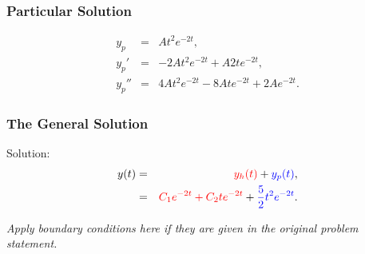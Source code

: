 \begin{frame}
  \frametitle{Particular Solution}

  \vspace*{-3em}
  \begin{eqnarray*}
    y_p & = & A t^2 e^{-2t}, \\
    y_p' & = & -2 A t^2 e^{-2t} + A 2t e^{-2t}, \\
    y_p'' & = & 4 A t^2 e^{-2t} - 8A t e^{-2t} + 2 A e^{-2t}.
  \end{eqnarray*}
  \vspace*{-2.5em}




\end{frame}


\begin{frame}
  \frametitle{The General Solution}
  Solution:
  \begin{eqnarray*}
    y(t) & = & {\color{red}y_h(t)} + {\color{blue}y_p(t)}, \\
         & = & {\color{red}C_1 e^{-2t} + C_2 t e^{-2 t}} + {\color{blue}\frac{5}{2} t^2 e^{-2t}}.
  \end{eqnarray*}

  \textit{Apply boundary conditions here if they are given in the original problem statement.}

\end{frame}


